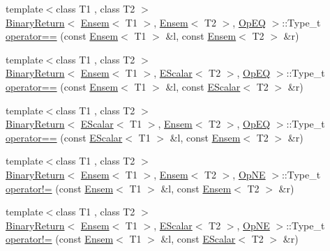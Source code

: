 \begin{DoxyCompactItemize}
\item 
{\footnotesize template$<$class T1 , class T2 $>$ }\\\mbox{\hyperlink{structENSEM_1_1BinaryReturn}{Binary\+Return}}$<$ \mbox{\hyperlink{classENSEM_1_1Ensem}{Ensem}}$<$ T1 $>$, \mbox{\hyperlink{classENSEM_1_1Ensem}{Ensem}}$<$ T2 $>$, \mbox{\hyperlink{structENSEM_1_1OpEQ}{Op\+EQ}} $>$\+::Type\+\_\+t \mbox{\hyperlink{group__eensem_ga8f2413d9b23131f67cbe4d3bd222e0ec}{operator==}} (const \mbox{\hyperlink{classENSEM_1_1Ensem}{Ensem}}$<$ T1 $>$ \&l, const \mbox{\hyperlink{classENSEM_1_1Ensem}{Ensem}}$<$ T2 $>$ \&r)
\item 
{\footnotesize template$<$class T1 , class T2 $>$ }\\\mbox{\hyperlink{structENSEM_1_1BinaryReturn}{Binary\+Return}}$<$ \mbox{\hyperlink{classENSEM_1_1Ensem}{Ensem}}$<$ T1 $>$, \mbox{\hyperlink{classENSEM_1_1EScalar}{E\+Scalar}}$<$ T2 $>$, \mbox{\hyperlink{structENSEM_1_1OpEQ}{Op\+EQ}} $>$\+::Type\+\_\+t \mbox{\hyperlink{group__eensem_ga4b52007b3c1511c746a46b46e5b145b1}{operator==}} (const \mbox{\hyperlink{classENSEM_1_1Ensem}{Ensem}}$<$ T1 $>$ \&l, const \mbox{\hyperlink{classENSEM_1_1EScalar}{E\+Scalar}}$<$ T2 $>$ \&r)
\item 
{\footnotesize template$<$class T1 , class T2 $>$ }\\\mbox{\hyperlink{structENSEM_1_1BinaryReturn}{Binary\+Return}}$<$ \mbox{\hyperlink{classENSEM_1_1EScalar}{E\+Scalar}}$<$ T1 $>$, \mbox{\hyperlink{classENSEM_1_1Ensem}{Ensem}}$<$ T2 $>$, \mbox{\hyperlink{structENSEM_1_1OpEQ}{Op\+EQ}} $>$\+::Type\+\_\+t \mbox{\hyperlink{group__eensem_gade522cbdb1f590216dd1c5e3dd034e79}{operator==}} (const \mbox{\hyperlink{classENSEM_1_1EScalar}{E\+Scalar}}$<$ T1 $>$ \&l, const \mbox{\hyperlink{classENSEM_1_1Ensem}{Ensem}}$<$ T2 $>$ \&r)
\item 
{\footnotesize template$<$class T1 , class T2 $>$ }\\\mbox{\hyperlink{structENSEM_1_1BinaryReturn}{Binary\+Return}}$<$ \mbox{\hyperlink{classENSEM_1_1Ensem}{Ensem}}$<$ T1 $>$, \mbox{\hyperlink{classENSEM_1_1Ensem}{Ensem}}$<$ T2 $>$, \mbox{\hyperlink{structENSEM_1_1OpNE}{Op\+NE}} $>$\+::Type\+\_\+t \mbox{\hyperlink{group__eensem_ga9f462a3d207e1a214ab95765f6fb90d3}{operator!=}} (const \mbox{\hyperlink{classENSEM_1_1Ensem}{Ensem}}$<$ T1 $>$ \&l, const \mbox{\hyperlink{classENSEM_1_1Ensem}{Ensem}}$<$ T2 $>$ \&r)
\item 
{\footnotesize template$<$class T1 , class T2 $>$ }\\\mbox{\hyperlink{structENSEM_1_1BinaryReturn}{Binary\+Return}}$<$ \mbox{\hyperlink{classENSEM_1_1Ensem}{Ensem}}$<$ T1 $>$, \mbox{\hyperlink{classENSEM_1_1EScalar}{E\+Scalar}}$<$ T2 $>$, \mbox{\hyperlink{structENSEM_1_1OpNE}{Op\+NE}} $>$\+::Type\+\_\+t \mbox{\hyperlink{group__eensem_ga8086f697f52b0363688785b35a8cdca3}{operator!=}} (const \mbox{\hyperlink{classENSEM_1_1Ensem}{Ensem}}$<$ T1 $>$ \&l, const \mbox{\hyperlink{classENSEM_1_1EScalar}{E\+Scalar}}$<$ T2 $>$ \&r)

\end{DoxyCompactItemize}
